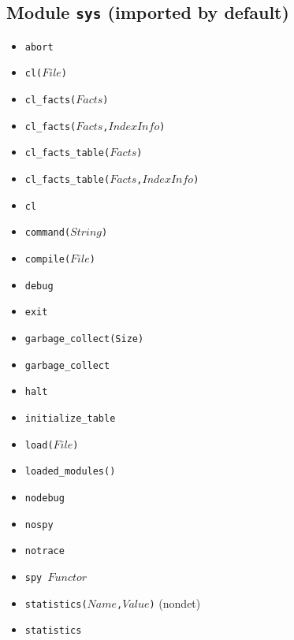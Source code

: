 \documentclass[10pt]{article}
\begin{document}
\begin{multicols}{2}
\section*{Module \texttt{sys} (imported by default)}
\begin{scriptsize}
\begin{itemize}
    \item \texttt{abort}
    \item \texttt{cl($File$)}
    \item \texttt{cl\_facts($Facts$)}
    \item \texttt{cl\_facts($Facts$,$IndexInfo$)}    
    \item \texttt{cl\_facts\_table($Facts$)}
    \item \texttt{cl\_facts\_table($Facts$,$IndexInfo$)}
    \item \texttt{cl}
    \item \texttt{command($String$)}
    \item \texttt{compile($File$)}
    \item \texttt{debug}
    \item \texttt{exit} 
    \item \texttt{garbage\_collect(Size)} 
    \item \texttt{garbage\_collect} 
    \item \texttt{halt} 
    \item \texttt{initialize\_table}
    \item \texttt{load($File$)}
    \item \texttt{loaded\_modules()}
    \item \texttt{nodebug}
    \item \texttt{nospy}
    \item \texttt{notrace}
    \item \texttt{spy $Functor$}
    \item \texttt{statistics($Name$,$Value$)} (nondet) 
    \item \texttt{statistics}

\end{itemize}
\end{scriptsize}
\end{multicols}
\end{document}
